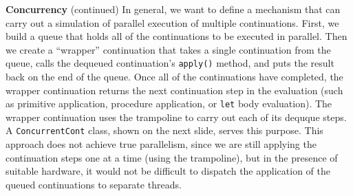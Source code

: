 \begin{minipage}[t]{\sw}
\slidenumber
\LARGE
{\bf Concurrency} (continued)\exx
In general, we want to define a mechanism
that can carry out a simulation of parallel execution
of multiple continuations.
First, we build a queue that holds all of the continuations
to be executed in parallel.
Then we create a ``wrapper'' continuation
that takes a single continuation from the queue,
calls the dequeued continuation's \verb'apply()' method,
and puts the result back on the end of the queue.
Once all of the continuations have completed,
the wrapper continuation returns
the next continuation step in the evaluation
(such as primitive application, procedure application,
or \verb'let' body evaluation).
The wrapper continuation uses the trampoline
to carry out each of its dequque steps.
A \verb'ConcurrentCont' class,
shown on the next slide, serves this purpose.\exx
This approach does not achieve true parallelism,
since we are still applying the continuation steps
one at a time (using the trampoline),
but in the presence of suitable hardware,
it would not be difficult to dispatch the application
of the queued continuations to separate threads.
\end{minipage}
